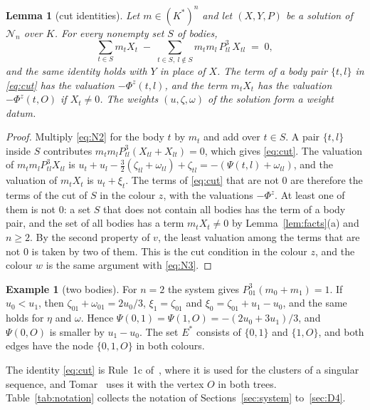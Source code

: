\documentclass[11pt]{amsart}
\newtheorem{lemma}[theorem]{Lemma}
\theoremstyle{definition}
\newtheorem{example}[theorem]{Example}
\theoremstyle{remark}
\numberwithin{equation}{section}
\newcommand{\cN}{\mathcal{N}}
\newcommand{\Es}{E^{*}}
\begin{document}
\begin{lemma}[cut identities]\label{lem:A}
Let $m \in (K^{*})^n$ and let $(X, Y, P)$ be a solution of $\cN_n$ over $K$. For every nonempty set $S$
of bodies,
\begin{equation}\label{eq:cut}
  \sum_{t \in S} m_t X_t \;-\; \sum_{t \in S,\ l \notin S} m_t m_l\, P_{tl}^3\, X_{tl} \;=\; 0 ,
\end{equation}
and the same identity holds with $Y$ in place of $X$. The term of a body pair $\{t, l\}$ in
\eqref{eq:cut} has the valuation $-\Phi^z(t, l)$, and the term $m_t X_t$ has the valuation
$-\Phi^z(t, O)$ if $X_t \ne 0$. The weights $(u, \zeta, \omega)$ of the solution form a weight datum.
\end{lemma}

\begin{proof}
Multiply \eqref{eq:N2} for the body $t$ by $m_t$ and add over $t \in S$. A pair $\{t, l\}$ inside $S$
contributes $m_t m_l P_{tl}^3 (X_{tl} + X_{lt}) = 0$, which gives \eqref{eq:cut}. The valuation of
$m_t m_l P_{tl}^3 X_{tl}$ is
$u_t + u_l - \tfrac32 (\zeta_{tl} + \omega_{tl}) + \zeta_{tl} = -(\Psi(t, l) + \omega_{tl})$, and the
valuation of $m_t X_t$ is $u_t + \xi_t$. The terms of \eqref{eq:cut} that are not $0$ are therefore the
terms of the cut of $S$ in the colour $z$, with the valuations $-\Phi^z$. At least one of them is not
$0$: a set $S$ that does not contain all bodies has the term of a body pair, and the set of all bodies
has a term $m_t X_t \ne 0$ by Lemma~\ref{lem:facts}(a) and $n \ge 2$. By the second property of $v$, the
least valuation among the terms that are not $0$ is taken by two of them. This is the cut condition in
the colour $z$, and the colour $w$ is the same argument with \eqref{eq:N3}.
\end{proof}

\begin{example}[two bodies]\label{ex:n2}
For $n = 2$ the system gives $P_{01}^3 (m_0 + m_1) = 1$. If $u_0 < u_1$, then
$\zeta_{01} + \omega_{01} = 2u_0/3$, $\xi_1 = \zeta_{01}$ and $\xi_0 = \zeta_{01} + u_1 - u_0$, and the
same holds for $\eta$ and $\omega$. Hence $\Psi(0, 1) = \Psi(1, O) = -(2u_0 + 3u_1)/3$, and
$\Psi(0, O)$ is smaller by $u_1 - u_0$. The set $\Es$ consists of $\{0, 1\}$ and $\{1, O\}$, and both
edges have the node $\{0, 1, O\}$ in both colours.
\end{example}

The identity \eqref{eq:cut} is Rule~1c of~\cite{albouykaloshin2012}, where it is used for the clusters
of a singular sequence, and Tomar~\cite[\S 4.1 and \S 9]{tomar6} uses it with the vertex $O$ in both
trees. Table~\ref{tab:notation} collects the notation of Sections~\ref{sec:system}
to~\ref{sec:D4}.
\end{document}

